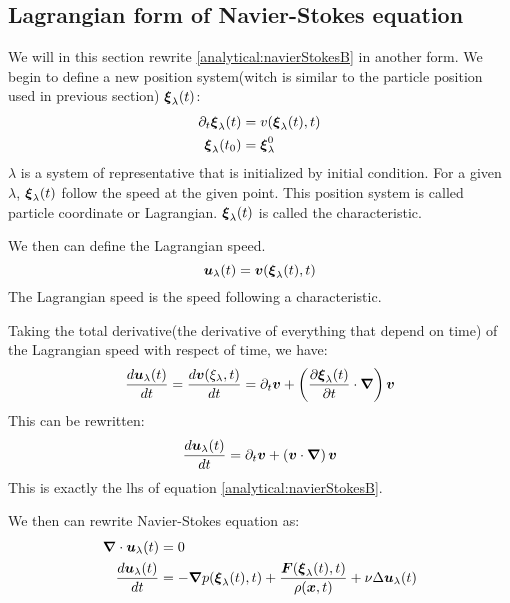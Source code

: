 \subsection{Lagrangian form of Navier-Stokes equation}
\label{analytical:convectif}
We will in this section rewrite \ref{analytical:navierStokesB} in another form.
We begin to define a new position system(witch is similar to the particle position used in previous section) ${\boldsymbol {\xi}}_{\lambda}(t)$:
\begin{subequations}
\begin{align}
 \partial_t {\boldsymbol {\xi}}_{\lambda}(t)&=v({\boldsymbol {\xi}}_{\lambda}(t),t)\\
 {\boldsymbol {\xi}}_{\lambda}(t_0)&={\boldsymbol {\xi}}^{0}_{\lambda}
\end{align}
\end{subequations}
$\lambda$ is a system of representative that is initialized by initial condition.
For a given $\lambda$, ${\boldsymbol {\xi}}_{\lambda}(t)$ follow the speed at the given point.
This position system is called particle coordinate or Lagrangian.
${\boldsymbol {\xi}}_\lambda(t)$ is called the characteristic.

We then can define the Lagrangian speed.
\begin{equation}
 {\boldsymbol {u}}_{\lambda}(t)={\boldsymbol {v}}({\boldsymbol {\xi}}_{\lambda}(t),t)
\end{equation}
The Lagrangian speed is the speed following a characteristic.

Taking the total derivative(the derivative of everything that depend on time) of the Lagrangian speed with respect of time, we have:
\begin{equation}
\frac{d {\boldsymbol {u}}_{\lambda}(t)}{d t}=\frac{d {\boldsymbol {v}}(\xi_{\lambda},t)}{d t}=\partial_t {\boldsymbol {v}}+\left(\frac{\partial {\boldsymbol {\xi}}_{\lambda}(t)}{\partial t}\cdot{\boldsymbol {\nabla}}\right){\boldsymbol {v}}
\end{equation}
This can be rewritten:
\begin{equation}
\frac{d {\boldsymbol {u}}_{\lambda}(t)}{d t}=\partial_t {\boldsymbol {v}}+\left({\boldsymbol {v}} \cdot{\boldsymbol {\nabla}}\right){\boldsymbol {v}}
\end{equation}
This is exactly the lhs of equation \ref{analytical:navierStokesB}.

We then can rewrite Navier-Stokes equation as:
\begin{subequations}
\begin{align}
\label{analytical:navierStokesLagA}
{\boldsymbol {\nabla}} \cdot {\boldsymbol {u}}_{\lambda}(t)&=0\\
\label{analytical:navierStokesLagB}
\frac{d {\boldsymbol {u}}_{\lambda}(t)}{d t}&=-{\boldsymbol {\nabla}} p({\boldsymbol {\xi}}_{\lambda}(t),t)+\frac{{\boldsymbol {F}}({\boldsymbol {\xi}}_{\lambda}(t),t)}{\rho({\boldsymbol {x}},t)}+\nu \Delta {\boldsymbol {u}}_{\lambda}(t)
\end{align}
\end{subequations}

